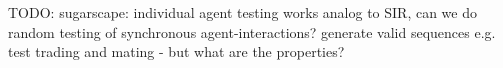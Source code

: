 



TODO: sugarscape: individual agent testing works analog to SIR, can we do random testing of synchronous agent-interactions? generate valid sequences e.g. test trading and mating - but what are the properties?